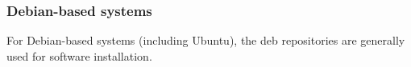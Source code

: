 \documentclass{article}
\begin{document}


\subsubsection{Debian-based systems}\label{install.debian}
For Debian-based systems (including Ubuntu), the deb repositories
are generally used for software installation.
\end{document}
